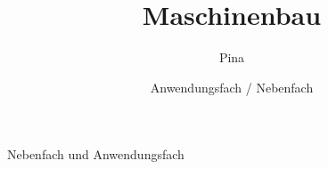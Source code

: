 \documentclass[11pt]{beamer}
\title[Anwendungsfach / Nebenfach: Maschinenbau] %
{Maschinenbau}
\author {Pina \faHandPeaceO}
\date[WiSe2021] %
{Anwendungsfach / Nebenfach}
\begin{document}
\begin{frame}
	\titlepage
\end{frame}


\begin{frame}{Nebenfach und Anwendungsfach}




\end{frame}
\end{document}
